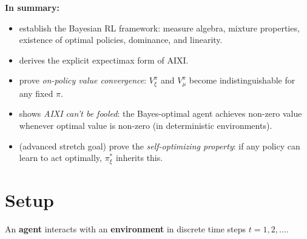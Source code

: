 \documentclass[fontsize=11pt, parskip=half]{scrartcl}
\begin{document}
\textbf{In summary:}
\begin{itemize}\itemsep=2pt
    \item {} establish the Bayesian RL framework: measure algebra, mixture properties, existence of optimal policies, dominance, and linearity.
    \item {} derives the explicit expectimax form of AIXI.
    \item {} prove \emph{on-policy value convergence}: $V_\xi^\pi$ and $V_\mu^\pi$ become indistinguishable for any fixed $\pi$.
    \item {} shows \emph{AIXI can't be fooled}: the Bayes-optimal agent achieves non-zero value whenever optimal value is non-zero (in deterministic environments).
    \item {} (advanced stretch goal) prove the \emph{self-optimizing property}: if any policy can learn to act optimally, $\pi_\xi^*$ inherits this.
\end{itemize}



\section*{Setup}

An \textbf{agent} interacts with an \textbf{environment} in discrete time steps $t = 1, 2, \ldots$.
\end{document}
